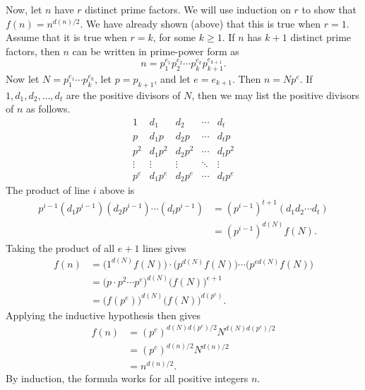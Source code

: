 \begin{solution}
  Now, let $n$ have $r$ distinct prime factors. We will use induction
  on $r$ to show that $f(n) = n^{d(n)/2}$. We have already shown
  (above) that this is true when $r = 1$. Assume that it is true when
  $r = k$, for some $k\geq1$. If $n$ has $k + 1$ distinct prime
  factors, then $n$ can be written in prime-power form as
  \begin{equation*}
    n = p_1^{e_1}p_2^{e_2}\cdots p_k^{e_k}p_{k+1}^{e_{k+1}}.
  \end{equation*}
  Now let $N = p_1^{e_1}\cdots p_k^{e_k}$, let $p = p_{k+1}$, and let
  $e = e_{k+1}$. Then $n = Np^e$. If $1, d_1, d_2, \dots, d_t$ are the
  positive divisors of $N$, then we may list the positive divisors of
  $n$ as follows.
  \begin{equation*}
    \begin{matrix}
      1 & d_1 & d_2 & \cdots & d_t \\
      p & d_1p & d_2p & \cdots & d_tp \\
      p^2 & d_1p^2 & d_2p^2 & \cdots & d_tp^2 \\
      \vdots & \vdots & \vdots & \ddots & \vdots \\
      p^e & d_1p^e & d_2p^e & \cdots & d_tp^e
    \end{matrix}
  \end{equation*}
  The product of line $i$ above is
  \begin{align*}
    p^{i-1}(d_1p^{i-1})(d_2p^{i-1})\cdots(d_tp^{i-1})
    &= (p^{i-1})^{t+1}(d_1d_2\cdots d_t) \\
    &= (p^{i-1})^{d(N)}f(N).
  \end{align*}
  Taking the product of all $e+1$ lines gives
  \begin{align*}
    f(n) &= \big(1^{d(N)}f(N)\big)\cdot\big(p^{d(N)}f(N)\big)
    \cdots\big(p^{ed(N)}f(N)\big) \\
         &= \big(p\cdot p^2\cdots p^e\big)^{d(N)}\big(f(N)\big)^{e+1} \\
         &= \big(f(p^e)\big)^{d(N)}\big(f(N)\big)^{d(p^e)}.
  \end{align*}
  Applying the inductive hypothesis then gives
  \begin{align*}
    f(n) &= (p^e)^{d(N)d(p^e)/2}N^{d(N)d(p^e)/2} \\
         &= (p^e)^{d(n)/2}N^{d(n)/2} \\
         &= n^{d(n)/2}.
  \end{align*}
  By induction, the formula works for all positive integers $n$.
\end{solution}
